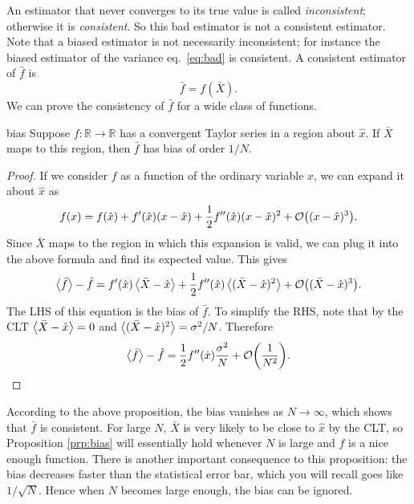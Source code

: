 An estimator that never converges to its true value is called
{\it inconsistent}; otherwise it is {\it consistent}.
So this bad estimator is not a consistent estimator. Note that a biased
estimator is not necessarily inconsistent; for instance the biased estimator
of the variance eq.~\eqref{eq:bad} is consistent. A consistent estimator
of $\hat{f}$ is
\begin{equation}
  \bar{f}=f(\bar{X}).
\end{equation} 
We can prove the consistency of $\bar{f}$ for a wide class of functions.
\begin{proposition}{}{bias}
  Suppose $f:\mathbb{R}\to\mathbb{R}$ has a convergent Taylor series 
  in a region about $\hat{x}$. If $\bar{X}$ maps to this region, 
  then $\bar{f}$ has bias of order $1/N$.
  \begin{proof}
    If we consider $f$ as a function of the ordinary variable $x$, we can
    expand it about $\hat{x}$ as
    $$
      f(x)=f(\hat{x})+f'(\hat{x})(x-\hat{x})
           +\frac{1}{2}f''(\hat{x})(x-\hat{x})^2
           +\order{(x-\hat{x})^3}.
    $$
    Since $\bar{X}$ maps to the region in which this expansion is valid,
    we can plug it into the above formula and find its expected value.
    This gives
    $$
      \ev{\bar{f}}-\hat{f}=f'(\hat{x})\ev{\bar{X}-\hat{x}}
           +\frac{1}{2}f''(\hat{x})\ev{(\bar{X}-\hat{x})^2}
           +\order{(\bar{X}-\hat{x})^3}.
    $$
    The LHS of this equation is the bias of $\bar{f}$. To simplify the
    RHS, note that by the CLT $\ev{\bar{X}-\hat{x}}=0$ and
    $\ev{(\bar{X}-\hat{x})^2}=\sigma^2/N$. Therefore
    $$
      \ev{\bar{f}}-\hat{f}=\frac{1}{2}f''(\hat{x})\frac{\sigma^2}{N}
                           +\order{\frac{1}{N^2}}.
    $$
  \end{proof}
\end{proposition}
According to the above proposition, the bias vanishes as $N\to\infty$, which
shows that $\bar{f}$ is consistent. For large $N$, $\bar{X}$ is very likely
to be close to $\hat{x}$ by the CLT, so Proposition \ref{prp:bias} will 
essentially hold whenever $N$ is large and $f$ is a nice enough function.
There is another important consequence to this proposition: the bias
decreases faster than the statistical error bar, which you will recall
goes like $1/\sqrt{N}$. Hence when $N$ becomes large enough, the bias
can be ignored.

